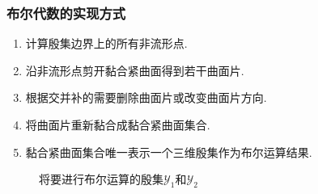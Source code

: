 \documentclass[UTF8]{ctexbeamer}	%
\theoremstyle{plain}
\theoremstyle{definition}
\theoremstyle{remark}
\numberwithin{equation}{section}
\begin{document}
\begin{frame}
    \frametitle{布尔代数的实现方式}
    \begin{enumerate}
        \item 计算殷集边界上的所有非流形点.
        \item 沿非流形点剪开黏合紧曲面得到若干曲面片.
        \item 根据交并补的需要删除曲面片或改变曲面片方向.
        \item 将曲面片重新黏合成黏合紧曲面集合.
        \item 黏合紧曲面集合唯一表示一个三维殷集作为布尔运算结果.
    \end{enumerate}
    \begin{figure}[!htb]
        \centering
         \qquad
        \caption{将要进行布尔运算的殷集$\mathcal{Y}_1$和$\mathcal{Y}_2$}
        \vspace{0.2in}
    \end{figure}
\end{frame}
\end{document}
